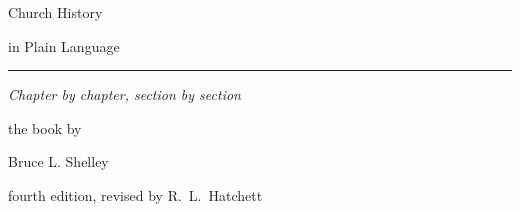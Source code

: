 \begin{titlepage}
\thispagestyle{empty}
\vspace*{0.13\textheight}
\begin{center}
{\sffamily\small\color{sbaccent}\par}
\vspace{24pt}
{\fontsize{31}{38}\selectfont Church History\par}
{\fontsize{31}{38}\selectfont in Plain Language\par}
\vspace{20pt}
{\color{sbaccent}\rule{3.2em}{1.2pt}\par}
\vspace{20pt}
{\large\itshape Chapter by chapter, section by section\par}
\vfill
{\small\color{sbgray}the book by\par}
\vspace{5pt}
{\Large Bruce L. Shelley\par}
\vspace{7pt}
{\small\color{sbgray}fourth edition, revised by R.~L.~Hatchett\par}
\vspace{0.09\textheight}
{\sffamily\scriptsize\color{sbgray}\par}
\end{center}
\end{titlepage}
